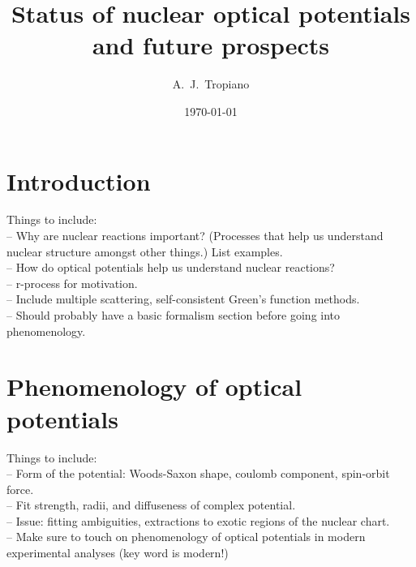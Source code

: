 \documentclass[preprintnumbers,floatfix,aps,prc,preprint,nofootinbib]{revtex4-1}
\begin{document}
\title{Status of nuclear optical potentials and future prospects}


\author{A.~J.~Tropiano}


\date{\today}

\maketitle

\newpage


\section{Introduction}
\label{sec:intro}


Things to include:
\\
-- Why are nuclear reactions important? (Processes that help us understand nuclear structure amongst other things.) List examples.
\\
-- How do optical potentials help us understand nuclear reactions?
\\
-- r-process for motivation.
\\
-- Include multiple scattering, self-consistent Green's function methods.
\\
-- Should probably have a basic formalism section before going into phenomenology.


\section{Phenomenology of optical potentials}
\label{sec:section_2}


Things to include:
\\
-- Form of the potential: Woods-Saxon shape, coulomb component, spin-orbit force.
\\
-- Fit strength, radii, and diffuseness of complex potential.
\\
-- Issue: fitting ambiguities, extractions to exotic regions of the nuclear chart.
\\
-- Make sure to touch on phenomenology of optical potentials in modern experimental analyses (key word is modern!)
\end{document}
